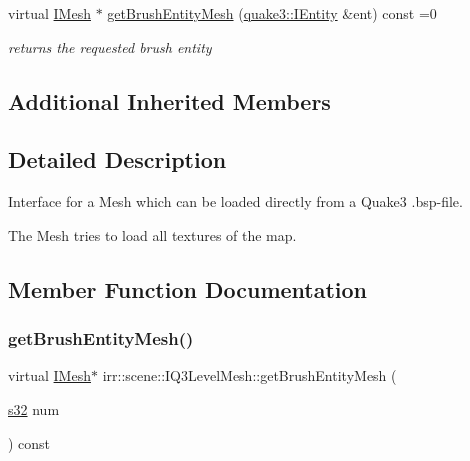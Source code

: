 \begin{DoxyCompactItemize}
\mbox{\label{classirr_1_1scene_1_1IQ3LevelMesh_a31276c90be36a1c7c5b8e87433dd5f63}} 
virtual \hyperlink{classirr_1_1scene_1_1IMesh}{I\+Mesh} $\ast$ \hyperlink{classirr_1_1scene_1_1IQ3LevelMesh_a31276c90be36a1c7c5b8e87433dd5f63}{get\+Brush\+Entity\+Mesh} (\hyperlink{structirr_1_1scene_1_1quake3_1_1IShader}{quake3\+::\+I\+Entity} \&ent) const =0
\begin{DoxyCompactList}\small\item\em returns the requested brush entity \end{DoxyCompactList}\end{DoxyCompactItemize}
\subsection*{Additional Inherited Members}


\subsection{Detailed Description}
Interface for a Mesh which can be loaded directly from a Quake3 .bsp-\/file. 

The Mesh tries to load all textures of the map. 

\subsection{Member Function Documentation}
\mbox{\label{classirr_1_1scene_1_1IQ3LevelMesh_ad0ed15c97e55ffb02d1d48fb62a769d5}} 
\subsubsection{\texorpdfstring{get\+Brush\+Entity\+Mesh()}{getBrushEntityMesh()}}
{\footnotesize\ttfamily virtual \hyperlink{classirr_1_1scene_1_1IMesh}{I\+Mesh}$\ast$ irr\+::scene\+::\+I\+Q3\+Level\+Mesh\+::get\+Brush\+Entity\+Mesh (\begin{DoxyParamCaption}\item[{\hyperlink{namespaceirr_ac66849b7a6ed16e30ebede579f9b47c6}{s32}}]{num }\end{DoxyParamCaption}) const\hspace{0.3cm}{\ttfamily [pure virtual]}}



